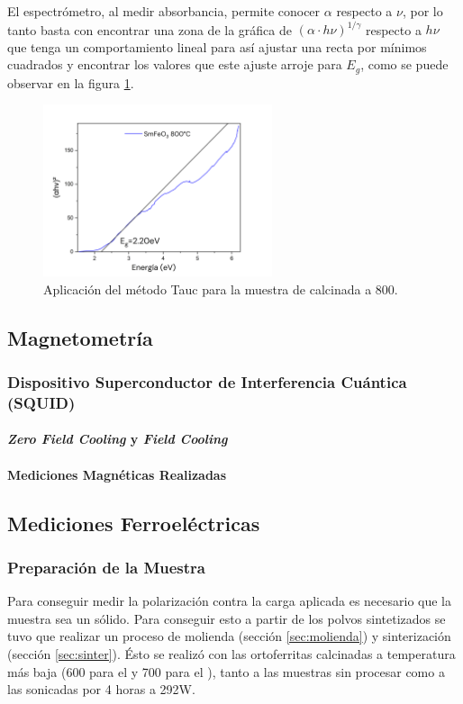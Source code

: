 \documentclass[../main.tex]{subfiles}
\begin{document}
El espectrómetro, al medir absorbancia, permite conocer $\alpha$ respecto a $\nu$, por lo tanto basta con encontrar una zona de la gráfica de $(\alpha\cdot h\nu)^{1/\gamma}$ respecto a $h\nu$ que tenga un comportamiento lineal para así ajustar una recta por mínimos cuadrados y encontrar los valores que este ajuste arroje para $E_g$, como se puede observar en la figura \ref{fig:ejemplotauc}.
\begin{figure}[H]
    \centering
    \includegraphics[width=0.6\textwidth]{fig/ejemplotauc.png}
    \caption{Aplicación del método Tauc para la muestra de \sama{} calcinada a 800\gradoC.}
    \label{fig:ejemplotauc}
\end{figure}
\subsection{Magnetometría}

\subsubsection{Dispositivo Superconductor de Interferencia Cuántica (SQUID)}

\paragraph{\textit{Zero Field Cooling} y \textit{Field Cooling}}

\paragraph{Mediciones Magnéticas Realizadas}

\subsection*{Mediciones Ferroeléctricas}

\subsubsection{Preparación de la Muestra}
Para conseguir medir la polarización contra la carga aplicada es necesario que la muestra sea un sólido. Para conseguir esto a partir de los polvos sintetizados se tuvo que realizar un proceso de molienda (sección \ref{sec:molienda}) y sinterización (sección \ref{sec:sinter}). Ésto se realizó con las ortoferritas calcinadas a temperatura más baja (600\gradoC{} para el \neod{} y 700\gradoC{} para el \sama{}), tanto a las muestras sin procesar como a las sonicadas por 4 horas a 292W.
\end{document}
